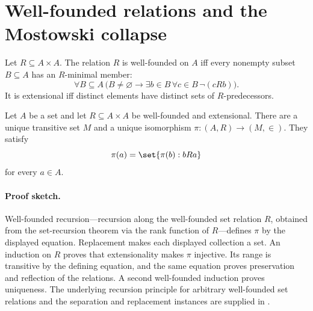 \section{Well-founded relations and the Mostowski collapse}
\label{sec:cumulative-hierarchy-03}

\begin{definition}
Let \(R\subseteq A\times A\).  The relation \(R\) is well-founded on \(A\)
iff every nonempty subset \(B\subseteq A\) has an \(R\)-minimal
member:
\[
  \forall B\subseteq A\,
  \bigl(B\ne\varnothing\to
        \exists b\in B\,\forall c\in B\,\neg(cRb)\bigr).
\]
It is extensional iff distinct elements have distinct sets of
\(R\)-predecessors.
\end{definition}

\begin{theorem}
Let \(A\) be a set and let \(R\subseteq A\times A\) be well-founded and
extensional.  There are a unique transitive set \(M\) and a unique isomorphism
\(\pi:(A,R)\to(M,\in)\).  They satisfy
\[
  \pi(a)=\set{\pi(b):bRa}
\]
for every \(a\in A\).
\end{theorem}

\paragraph{Proof sketch.}
Well-founded recursion---recursion along the well-founded set relation
\(R\), obtained from the set-recursion theorem via the rank function of
\(R\)---defines \(\pi\) by the displayed equation.  Replacement
makes each displayed collection a set.  An induction on \(R\) proves that
extensionality makes \(\pi\) injective.  Its range is transitive by the defining
equation, and the same equation proves preservation and reflection of the
relations.  A second well-founded induction proves uniqueness.  The
underlying recursion principle for arbitrary well-founded set relations and
the separation and replacement instances are supplied in
\cite[Chapter~6]{Jech2003}.

